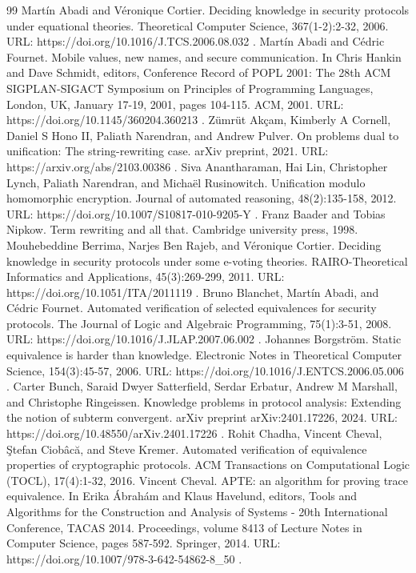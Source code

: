 \begin{thebibliography}{99}
 Martín Abadi and Véronique Cortier. Deciding knowledge in security protocols under equational theories. Theoretical Computer Science, 367(1-2):2-32, 2006. URL: https://doi.org/10.1016/J.TCS.2006.08.032 .
 Martín Abadi and Cédric Fournet. Mobile values, new names, and secure communication. In Chris Hankin and Dave Schmidt, editors, Conference Record of POPL 2001: The 28th ACM SIGPLAN-SIGACT Symposium on Principles of Programming Languages, London, UK, January 17-19, 2001, pages 104-115. ACM, 2001. URL: https://doi.org/10.1145/360204.360213 .
 Zümrüt Akçam, Kimberly A Cornell, Daniel S Hono II, Paliath Narendran, and Andrew Pulver. On problems dual to unification: The string-rewriting case. arXiv preprint, 2021. URL: https://arxiv.org/abs/2103.00386 .
 Siva Anantharaman, Hai Lin, Christopher Lynch, Paliath Narendran, and Michaël Rusinowitch. Unification modulo homomorphic encryption. Journal of automated reasoning, 48(2):135-158, 2012. URL: https://doi.org/10.1007/S10817-010-9205-Y .
 Franz Baader and Tobias Nipkow. Term rewriting and all that. Cambridge university press, 1998.
 Mouhebeddine Berrima, Narjes Ben Rajeb, and Véronique Cortier. Deciding knowledge in security protocols under some e-voting theories. RAIRO-Theoretical Informatics and Applications, 45(3):269-299, 2011. URL: https://doi.org/10.1051/ITA/2011119 .
 Bruno Blanchet, Martín Abadi, and Cédric Fournet. Automated verification of selected equivalences for security protocols. The Journal of Logic and Algebraic Programming, 75(1):3-51, 2008. URL: https://doi.org/10.1016/J.JLAP.2007.06.002 .
 Johannes Borgström. Static equivalence is harder than knowledge. Electronic Notes in Theoretical Computer Science, 154(3):45-57, 2006. URL: https://doi.org/10.1016/J.ENTCS.2006.05.006 .
 Carter Bunch, Saraid Dwyer Satterfield, Serdar Erbatur, Andrew M Marshall, and Christophe Ringeissen. Knowledge problems in protocol analysis: Extending the notion of subterm convergent. arXiv preprint arXiv:2401.17226, 2024. URL: https://doi.org/10.48550/arXiv.2401.17226 .
 Rohit Chadha, Vincent Cheval, Ştefan Ciobâcă, and Steve Kremer. Automated verification of equivalence properties of cryptographic protocols. ACM Transactions on Computational Logic (TOCL), 17(4):1-32, 2016.
 Vincent Cheval. APTE: an algorithm for proving trace equivalence. In Erika Ábrahám and Klaus Havelund, editors, Tools and Algorithms for the Construction and Analysis of Systems - 20th International Conference, TACAS 2014. Proceedings, volume 8413 of Lecture Notes in Computer Science, pages 587-592. Springer, 2014. URL: https://doi.org/10.1007/978-3-642-54862-8\_50 .

\end{thebibliography}
